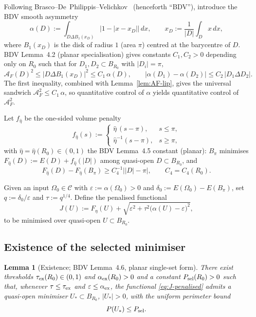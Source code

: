 \documentclass[11pt]{amsart}
\newtheorem{lemma}[theorem]{Lemma}
\newcommand{\AF}{\mathcal A_F}
\begin{document}
Following Brasco--De~Philippis--Velichkov~\cite{BDV2015} (henceforth
``BDV''), introduce the BDV smooth asymmetry
\[
   \alpha(D):=\int_{D\Delta B_1(x_D)}\bigl|1-|x-x_D|\bigr|\,dx,
   \qquad x_D:=\frac{1}{|D|}\int_D x\,dx,
\]
where \(B_1(x_D)\) is the disk of radius \(1\) (area \(\pi\)) centred at
the barycentre of \(D\).  BDV Lemma~4.2 (planar specialisation)
gives constants \(C_1,C_2>0\) depending only on \(R_0\) such that for
\(D_1,D_2\subset B_{R_0}\) with \(|D_i|=\pi\),
\begin{equation}\label{eq:BDV-42}
   \AF(D)^2\le |D\Delta B_1(x_D)|^2\le C_1\,\alpha(D),
   \qquad
   |\alpha(D_1)-\alpha(D_2)|\le C_2\,|D_1\Delta D_2|.
\end{equation}
The first inequality, combined with Lemma~\ref{lem:AF-lip}, gives the
universal sandwich \(\AF^2\le C_1\,\alpha\), so quantitative control of
\(\alpha\) yields quantitative control of \(\AF^2\).

Let \(f_{\hat\eta}\) be the one-sided volume penalty
\[
   f_{\hat\eta}(s):=
   \begin{cases}
      \hat\eta\,(s-\pi),&s\le\pi,\\
      \hat\eta^{-1}(s-\pi),&s\ge\pi,
   \end{cases}
\]
with \(\hat\eta=\hat\eta(R_0)\in(0,1)\) the BDV Lemma~4.5 constant
(planar): \(B_\pi\) minimises
\(F_{\hat\eta}(D):=E(D)+f_{\hat\eta}(|D|)\) among quasi-open
\(D\subset B_{R_0}\), and
\begin{equation}\label{eq:Lem45}
   F_{\hat\eta}(D)-F_{\hat\eta}(B_\pi)
      \ge C_4^{-1}\bigl||D|-\pi\bigr|,
   \qquad C_4=C_4(R_0).
\end{equation}

Given an input \(\Omega_0\in\mathcal C\) with
\(\varepsilon:=\alpha(\Omega_0)>0\) and
\(\delta_0:=E(\Omega_0)-E(B_\pi)\), set
\(q:=\delta_0/\varepsilon\) and \(\tau:=q^{1/4}\).  Define the penalised
functional
\begin{equation}\label{eq:J-penalised}
   J(U):=F_{\hat\eta}(U)+
      \sqrt{\varepsilon^{2}+\tau^{2}\bigl(\alpha(U)-\varepsilon\bigr)^{2}},
\end{equation}
to be minimised over quasi-open \(U\subset B_{R_0}\).

\subsection{Existence of the selected minimiser}\label{ss:existence}

\begin{lemma}[Existence; BDV Lemma~4.6, planar single-set form]
\label{lem:Ustar-exist}
There exist thresholds \(\tau_{\rm ex}(R_0)\in(0,1)\) and
\(\alpha_{\rm ex}(R_0)>0\) and a constant
\(P_{\rm sel}(R_0)>0\) such that, whenever
\(\tau\le\tau_{\rm ex}\) and \(\varepsilon\le\alpha_{\rm ex}\), the
functional \eqref{eq:J-penalised} admits a quasi-open minimiser
\(U_*\subset B_{R_0}\), \(|U_*|>0\), with the uniform perimeter bound
\begin{equation}\label{eq:P-Ustar}
   P(U_*)\le P_{\rm sel}.
\end{equation}
\end{lemma}
\end{document}
